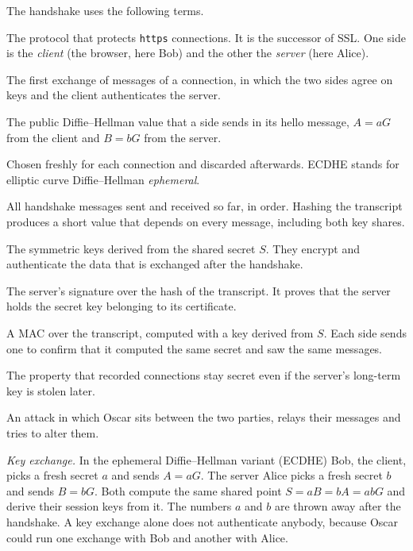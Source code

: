 \documentclass[11pt,a4paper]{article}
\theoremstyle{definition}
\begin{document}
The handshake uses the following terms.

\begin{description}[itemsep=0.4em]
\item[TLS (Transport Layer Security).] The protocol that protects \texttt{https} connections. It is the successor of SSL. One side is the \emph{client} (the browser, here Bob) and the other the \emph{server} (here Alice).
\item[Handshake.] The first exchange of messages of a connection, in which the two sides agree on keys and the client authenticates the server.
\item[Key share.] The public Diffie--Hellman value that a side sends in its hello message, $A=aG$ from the client and $B=bG$ from the server.
\item[Ephemeral.] Chosen freshly for each connection and discarded afterwards. ECDHE stands for elliptic curve Diffie--Hellman \emph{ephemeral}.
\item[Transcript.] All handshake messages sent and received so far, in order. Hashing the transcript produces a short value that depends on every message, including both key shares.
\item[Session keys.] The symmetric keys derived from the shared secret $S$. They encrypt and authenticate the data that is exchanged after the handshake.
\item[\texttt{CertificateVerify}.] The server's signature over the hash of the transcript. It proves that the server holds the secret key belonging to its certificate.
\item[\texttt{Finished}.] A MAC over the transcript, computed with a key derived from $S$. Each side sends one to confirm that it computed the same secret and saw the same messages.
\item[Forward secrecy.] The property that recorded connections stay secret even if the server's long-term key is stolen later.
\item[Man-in-the-middle attack.] An attack in which Oscar sits between the two parties, relays their messages and tries to alter them.
\end{description}

\emph{Key exchange.} In the ephemeral Diffie--Hellman variant (ECDHE) Bob, the client, picks a fresh secret $a$ and sends $A=aG$. The server Alice picks a fresh secret $b$ and sends $B=bG$. Both compute the same shared point $S=aB=bA=abG$ and derive their session keys from it. The numbers $a$ and $b$ are thrown away after the handshake. A key exchange alone does not authenticate anybody, because Oscar could run one exchange with Bob and another with Alice.
\end{document}
